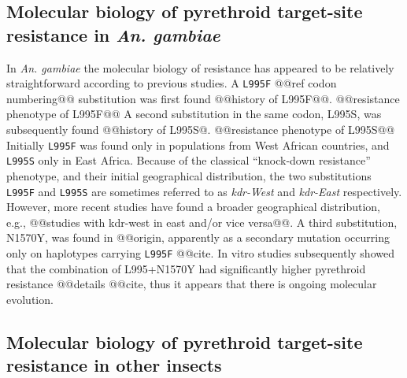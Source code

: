\documentclass[a4paper,11pt,abstracton,hidelinks]{scrartcl}
\newcommand{\agam}{\textit{An. gambiae}\xspace}
\begin{document}
\subsection*{Molecular biology of pyrethroid target-site resistance in \agam}


%
In \agam the molecular biology of resistance has appeared to be relatively straightforward according to previous studies.
%
A \texttt{L995F} @@ref codon numbering@@ substitution was first found @@history of L995F@@.
%
@@resistance phenotype of L995F@@
%
A second substitution in the same codon, L995S, was subsequently found @@history of L995S@.
%
@@resistance phenotype of L995S@@
%
Initially \texttt{L995F} was found only in populations from West African countries, and \texttt{L995S} only in East Africa.
%
Because of the classical ``knock-down resistance'' phenotype, and their initial geographical distribution, the two substitutions \texttt{L995F} and \texttt{L995S} are sometimes referred to as \textit{kdr-West} and \textit{kdr-East} respectively.
%
However, more recent studies have found a broader geographical distribution, e.g., @@studies with kdr-west in east and/or vice versa@@.
%
A third substitution, N1570Y, was found in @@origin, apparently as a secondary mutation occurring only on haplotypes carrying \texttt{L995F} @@cite.
%
In vitro studies subsequently showed that the combination of L995+N1570Y had significantly higher pyrethroid resistance @@details @@cite, thus it appears that there is ongoing molecular evolution.


\subsection*{Molecular biology of pyrethroid target-site resistance in other insects}
\end{document}

